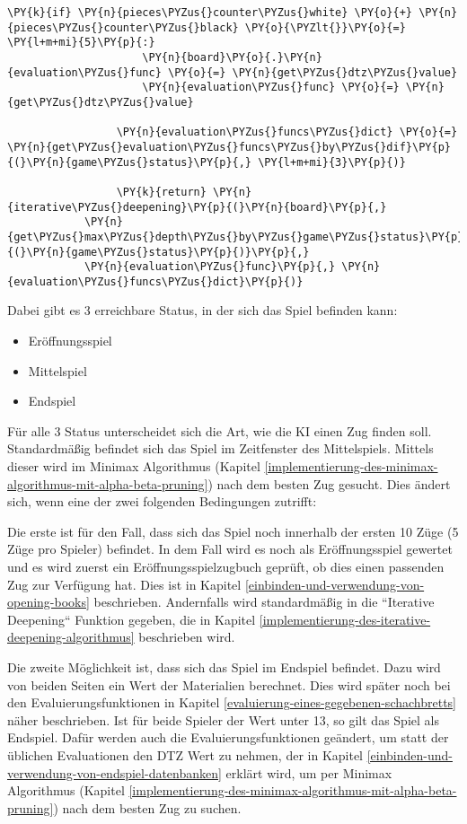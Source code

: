 \begin{Verbatim}[commandchars=\\\{\}]
                 \PY{k}{if} \PY{n}{pieces\PYZus{}counter\PYZus{}white} \PY{o}{+} \PY{n}{pieces\PYZus{}counter\PYZus{}black} \PY{o}{\PYZlt{}}\PY{o}{=} \PY{l+m+mi}{5}\PY{p}{:}
                     \PY{n}{board}\PY{o}{.}\PY{n}{evaluation\PYZus{}func} \PY{o}{=} \PY{n}{get\PYZus{}dtz\PYZus{}value}
                     \PY{n}{evaluation\PYZus{}func} \PY{o}{=} \PY{n}{get\PYZus{}dtz\PYZus{}value}
                 
                 \PY{n}{evaluation\PYZus{}funcs\PYZus{}dict} \PY{o}{=} \PY{n}{get\PYZus{}evaluation\PYZus{}funcs\PYZus{}by\PYZus{}dif}\PY{p}{(}\PY{n}{game\PYZus{}status}\PY{p}{,} \PY{l+m+mi}{3}\PY{p}{)}
         
                 \PY{k}{return} \PY{n}{iterative\PYZus{}deepening}\PY{p}{(}\PY{n}{board}\PY{p}{,} 
			\PY{n}{get\PYZus{}max\PYZus{}depth\PYZus{}by\PYZus{}game\PYZus{}status}\PY{p}{(}\PY{n}{game\PYZus{}status}\PY{p}{)}\PY{p}{,} 
			\PY{n}{evaluation\PYZus{}func}\PY{p}{,} \PY{n}{evaluation\PYZus{}funcs\PYZus{}dict}\PY{p}{)}
\end{Verbatim}

    Dabei gibt es 3 erreichbare Status, in der sich das Spiel befinden kann:

\begin{itemize}
\tightlist
\item
  Eröffnungsspiel
\item
  Mittelspiel
\item
  Endspiel
\end{itemize}

Für alle 3 Status unterscheidet sich die Art, wie die KI einen Zug
finden soll. Standardmäßig befindet sich das Spiel im Zeitfenster des
Mittelspiels. Mittels dieser wird im Minimax
Algorithmus (Kapitel \ref{implementierung-des-minimax-algorithmus-mit-alpha-beta-pruning}) nach dem besten Zug gesucht. Dies ändert sich, wenn
eine der zwei folgenden Bedingungen zutrifft:

Die erste ist für den Fall, dass sich das Spiel noch innerhalb der
ersten 10 Züge (5 Züge pro Spieler) befindet. In dem Fall wird es noch
als Eröffnungsspiel gewertet und es wird zuerst ein
Eröffnungsspielzugbuch geprüft, ob dies einen passenden Zug zur
Verfügung hat. Dies ist in Kapitel \ref{einbinden-und-verwendung-von-opening-books} beschrieben. Andernfalls wird
standardmäßig in die ``Iterative Deepening`` Funktion gegeben, die in
Kapitel \ref{implementierung-des-iterative-deepening-algorithmus} beschrieben wird.

Die zweite Möglichkeit ist, dass sich das Spiel im Endspiel befindet.
Dazu wird von beiden Seiten ein Wert der Materialien berechnet. Dies
wird später noch bei den Evaluierungsfunktionen in Kapitel \ref{evaluierung-eines-gegebenen-schachbretts} näher
beschrieben. Ist für beide Spieler der Wert unter 13, so gilt das Spiel
als Endspiel. Dafür werden auch die Evaluierungsfunktionen geändert, um
statt der üblichen Evaluationen den DTZ Wert zu nehmen, der in Kapitel
\ref{einbinden-und-verwendung-von-endspiel-datenbanken} erklärt wird, um per Minimax Algorithmus (Kapitel \ref{implementierung-des-minimax-algorithmus-mit-alpha-beta-pruning}) nach dem besten
Zug zu suchen.

